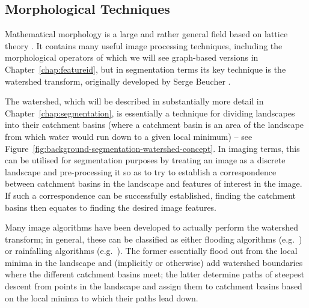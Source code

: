 \subsection{Morphological Techniques}
\label{subsec:background-segmentation-morphology}


Mathematical morphology is a large and rather general field based on lattice theory \cite{goutsias00}. It contains many useful image processing techniques, including the morphological operators of which we will see graph-based versions in Chapter~\ref{chap:featureid}, but in segmentation terms its key technique is the watershed transform, originally developed by Serge Beucher \cite{beucher90}.

The watershed, which will be described in substantially more detail in Chapter~\ref{chap:segmentation}, is essentially a technique for dividing landscapes into their catchment basins (where a catchment basin is an area of the landscape from which water would run down to a given local minimum) -- see Figure~\ref{fig:background-segmentation-watershed-concept}. In imaging terms, this can be utilised for segmentation purposes by treating an image as a discrete landscape and pre-processing it so as to try to establish a correspondence between catchment basins in the landscape and features of interest in the image. If such a correspondence can be successfully established, finding the catchment basins then equates to finding the desired image features.


Many image algorithms have been developed to actually perform the watershed transform; in general, these can be classified as either flooding algorithms (e.g.~\cite{bieniek00,rambabu07}) or rainfalling algorithms (e.g.~\cite{meijster98,osma-ruiz06,stoev00}). The former essentially flood out from the local minima in the landscape and (implicitly or otherwise) add watershed boundaries where the different catchment basins meet; the latter determine paths of steepest descent from points in the landscape and assign them to catchment basins based on the local minima to which their paths lead down.

